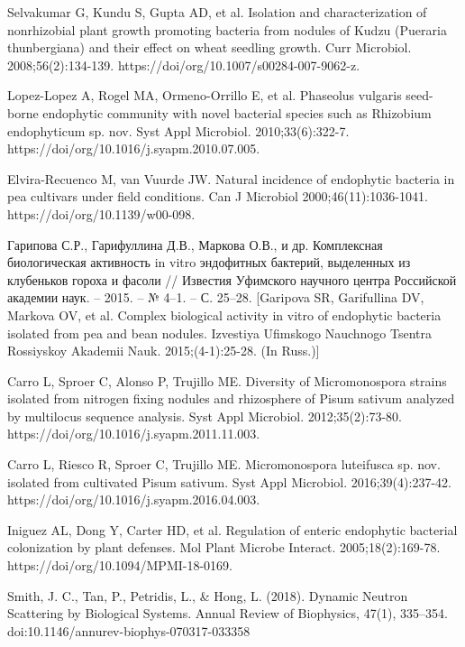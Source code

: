 \documentclass[11pt]{article}
\begin{document}
\begin{thebibliography}{3}
		 Selvakumar G, Kundu S, Gupta AD, et al. Isolation and characterization of nonrhizobial plant growth promoting bacteria from nodules of Kudzu (Pueraria thunbergiana) and their effect on wheat seedling growth. Curr Microbiol. 2008;56(2):134-139. https://doi/org/10.1007/s00284-007-9062-z.
		
		 Lopez-Lopez A, Rogel MA, Ormeno-Orrillo E, et al. Phaseolus vulgaris seed-borne endophytic community with novel bacterial species such as Rhizobium endophyticum sp. nov. Syst Appl Microbiol. 2010;33(6):322-7. https://doi/org/10.1016/j.syapm.2010.07.005.
		
		 Elvira-Recuenco M, van Vuurde JW. Natural incidence of endophytic bacteria in pea cultivars under field conditions. Can J Microbiol 2000;46(11):1036-1041. https://doi/org/10.1139/w00-098.
			
		 Гарипова С.Р., Гарифуллина Д.В., Маркова О.В., и др. Комплексная биологическая активность in vitro эндофитных бактерий, выделенных из клубеньков гороха и фасоли // Известия Уфимского научного центра Российской академии наук. – 2015. – № 4–1. – С. 25–28. [Garipova SR, Garifullina DV, Markova OV, et al. Complex biological activity in vitro of endophytic bacteria isolated from pea and bean nodules. Izvestiya Ufimskogo Nauchnogo Tsentra Rossiyskoy Akademii Nauk. 2015;(4-1):25-28. (In Russ.)]
		
		 Carro L, Sproer C, Alonso P, Trujillo ME. Diversity of Micromonospora strains isolated from nitrogen fixing nodules and rhizosphere of Pisum sativum analyzed by multilocus sequence analysis. Syst Appl Microbiol. 2012;35(2):73-80. https://doi/org/10.1016/j.syapm.2011.11.003.
			
		 Carro L, Riesco R, Sproer C, Trujillo ME. Micromonospora luteifusca sp. nov. isolated from cultivated Pisum sativum. Syst Appl Microbiol. 2016;39(4):237-42. https://doi/org/10.1016/j.syapm.2016.04.003.
		
		 Iniguez AL, Dong Y, Carter HD, et al. Regulation of enteric endophytic bacterial colonization by plant defenses. Mol Plant Microbe Interact. 2005;18(2):169-78. https://doi/org/10.1094/MPMI-18-0169.
		
		 Smith, J. C., Tan, P., Petridis, L., \& Hong, L. (2018). Dynamic Neutron Scattering by Biological Systems. Annual Review of Biophysics, 47(1), 335–354. doi:10.1146/annurev-biophys-070317-033358 
		

\end{thebibliography}
\end{document}
